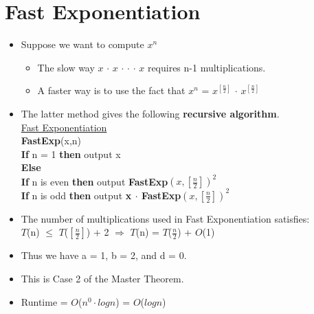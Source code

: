 \documentclass[12pt]{article}
\newcommand{\forceindent}{\leavevmode{\parindent=1em\indent}}
\begin{document}
\section{Fast Exponentiation}
\renewcommand{\labelitemii}{$\circ$}
\renewcommand{\labelitemiii}{$\cdot$}
\renewcommand{\labelitemiii}{$\rightarrow$}
\begin{itemize}
\item Suppose we want to compute $x^n$
	\begin{itemize}
	\item The slow way $x$ $\cdot$ $x$ $\cdot$ $\cdot$ $\cdot$ $x$ requires n-1 multiplications.
	\item A faster way is to use the fact that $x^n$ = $x^{[\frac{n}{2}]}$ $\cdot$ $x^{[\frac{n}{2}]}$
	\end{itemize}
\item The latter method gives the following \textbf{recursive algorithm}.\\

\underline{Fast Exponentiation}\\
\textbf{FastExp}(x,n)\\
\textbf{If} n = 1 \textbf{then} output x\\
\textbf{Else} \\
\forceindent \textbf{If} n is even \textbf{then} output \textbf{FastExp}$(x,[\frac{n}{2}])^2$\\
\forceindent \textbf{If} n is odd \textbf{then} output \textbf{x $\cdot$ FastExp}$(x,[\frac{n}{2}])^2$

\item The number of multiplications used in Fast Exponentiation satisfies:\\
$T$(n) $\leq$ $T$($[\frac{n}{2}]$) + 2 $\Rightarrow$ $T$(n) = $T$($\frac{n}{2}$) + $O$(1)
\item Thus we have a = 1, b = 2, and d = 0.
\item This is Case 2 of the Master Theorem.
\item Runtime = $O$($n^0 \cdot log{}n$) = $O$($log{}n$)
\end{itemize}
\end{document}

